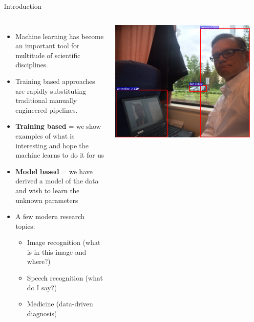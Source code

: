 \documentclass[10pt, aspectratio=169]{beamer} %
\begin{document}
\begin{frame}{Introduction}
    \begin{columns}
\begin{itemize}
\item Machine learning has become an important tool for multitude of scientific disciplines.
\item Training based approaches are rapidly substituting traditional
manually engineered pipelines.
\item \textbf{Training based} = we show examples of what is interesting
and hope the machine learns to do it for us
\item \textbf{Model based} = we have derived a model of the data and wish to
learn the unknown parameters
\item A few modern research topics:
\begin{itemize}
\item Image recognition (what is in this image and where?)
\item Speech recognition (what do I say?)
\item Medicine (data-driven diagnosis)
\end{itemize}
\end{itemize}
\vspace*{-0.8cm}
\hspace*{-0.4cm}
\includegraphics[width=1.2\columnwidth]{detections_hehu.png}\\
\vspace*{0.3cm}

\end{columns}
\end{frame}
\end{document}
